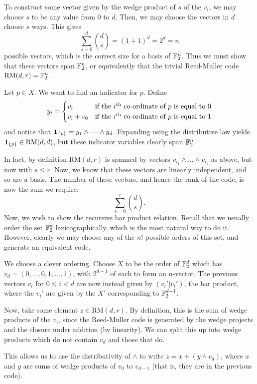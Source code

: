 \documentclass{article}
\begin{document}
\begin{prf}
    To construct some vector given by the wedge product of $s$ of the $v_i$, we may choose $s$ to be any value from 0 to $d$. Then, we may choose the vectors in $d$ choose $s$ ways. This gives
    \[
	\sum_{s = 0}^d \binom{d}{s} = (1 + 1)^d = 2^d = n
	\]
	possible vectors, which is the correct size for a basis of $\mathbb{F}_2^n$. Thus we must show that these vectors span $\mathbb{F}_2^n$, or equivalently that the trivial Reed-Muller code $\mathrm{RM}(d, r) = \mathbb{F}_2^n$.
	
	Let $p \in X$. We want to find an indicator for $p$. Define
	\[
	y_i = \begin{cases}
		v_i & \text{if the $i^{\text{th}}$ co-ordinate of $p$ is equal to 0} \\
		v_i + v_0 & \text{if the $i^{\text{th}}$ co-ordinate of $p$ is equal to 1}
	\end{cases}
	\]
	and notice that $\textbf{1}_{\left\lbrace p \right\rbrace} = y_1 \land \dots \land y_d$. Expanding using the distributive law yields $\textbf{1}_{\left\lbrace p \right\rbrace} \in \mathrm{RM}(d, d)$, but these indicator variables clearly span $\mathbb{F}_2^n$.
	
	In fact, by definition $\mathrm{RM}(d, r)$ is spanned by vectors $v_{i_1} \land \dots \land v_{i_s}$ as above, but now with $s \leq r$. Now, we know that these vectors are linearly independent, and so are a basis. The number of these vectors, and hence the rank of the code, is now the sum we require:
    \[
	\sum_{s = 0}^r \binom{d}{s}.
	\]
	Now, we wish to show the recursive bar product relation. Recall that we usually order the set $\mathbb{F}_2^d$ lexicographically, which is the most natural way to do it. However, clearly we may choose any of the $n!$ possible orders of this set, and generate an equivalent code.
	
	We choose a clever ordering. Choose $X$ to be the order of $\mathbb{F}_2^d$ which has $v_d = (0, \dots, 0, 1, \dots, 1)$, with $2^{d-1}$ of each to form an $n$-vector. The previous vectors $v_i$ for $0 \leq i < d$ are now instead given by $(v_i'|v_i')$, the bar product, where the $v_i'$ are given by the $X'$ corresponding to $\mathbb{F}_2^{d-1}$.
	
	Now, take some element $z \in \mathrm{RM}(d, r)$. By definition, this is the sum of wedge products of the  $v_i$, since the Reed-Muller code is generated by the wedge projects and the closure under addition (by linearity). We can split this up into wedge products which do not contain $v_d$ and those that do.
	
	This allows us to use the distributivity of $\land$ to write
	$z = x + (y \land v_d)$,
	where $x$ and $y$ are sums of wedge products of $v_0$ to $v_{d-1}$ (that is, they are in the previous code).
	

\end{prf}
\end{document}
